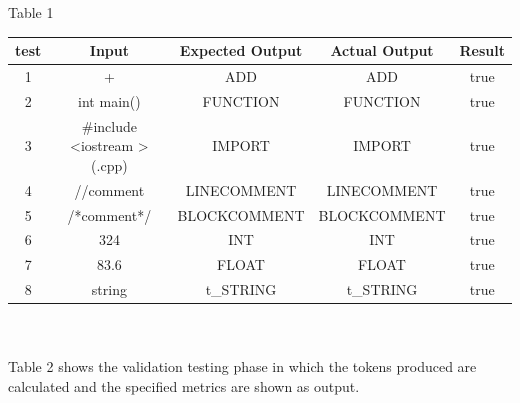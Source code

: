 \documentclass{scrreprt}
\begin{document}
	Table 1\\
	\begin{tabular}{|c|c|c|c|c|}
		\hline
		test & Input & Expected Output & Actual Output & Result \\ \hline
		1 & + & ADD & ADD & true\\ \hline
		2 & int main() & FUNCTION & FUNCTION & true\\ \hline
		3 & \#include \textless iostream \textgreater (.cpp) & IMPORT & IMPORT & true\\ \hline
		4 & //comment & LINECOMMENT & LINECOMMENT & true\\ \hline
		5 & /*comment*/ & BLOCKCOMMENT & BLOCKCOMMENT & true\\ \hline
		6 & 324 & INT & INT & true\\ \hline
		7 & 83.6 & FLOAT & FLOAT & true\\ \hline
		8 & string & t_STRING & t_STRING & true\\ \hline
		
	\end{tabular} \\\\
	
	Table 2 shows the validation testing phase in which the tokens produced are calculated and the specified metrics are shown as output.\\
	
\end{document}
